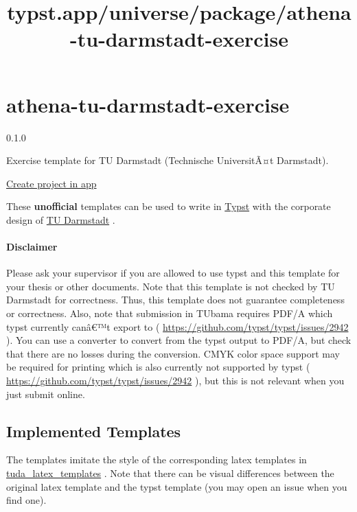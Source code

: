 \title{typst.app/universe/package/athena-tu-darmstadt-exercise}

\label{banner}
\label{template-thumbnail}

\section{athena-tu-darmstadt-exercise}\label{athena-tu-darmstadt-exercise}

{ 0.1.0 }

Exercise template for TU Darmstadt (Technische UniversitÃ¤t Darmstadt).

\href{/app?template=athena-tu-darmstadt-exercise&version=0.1.0}{Create
project in app}

\label{readme}
These \textbf{unofficial} templates can be used to write in
\href{https://github.com/typst/typst}{Typst} with the corporate design
of \href{https://www.tu-darmstadt.de/}{TU Darmstadt} .

\paragraph{Disclaimer}\label{disclaimer}

Please ask your supervisor if you are allowed to use typst and this
template for your thesis or other documents. Note that this template is
not checked by TU Darmstadt for correctness. Thus, this template does
not guarantee completeness or correctness. Also, note that submission in
TUbama requires PDF/A which typst currently canâ€™t export to (
\url{https://github.com/typst/typst/issues/2942} ). You can use a
converter to convert from the typst output to PDF/A, but check that
there are no losses during the conversion. CMYK color space support may
be required for printing which is also currently not supported by typst
( \url{https://github.com/typst/typst/issues/2942} ), but this is not
relevant when you just submit online.

\subsection{Implemented Templates}\label{implemented-templates}

The templates imitate the style of the corresponding latex templates in
\href{https://github.com/tudace/tuda_latex_templates}{tuda\_latex\_templates}
. Note that there can be visual differences between the original latex
template and the typst template (you may open an issue when you find
one).

